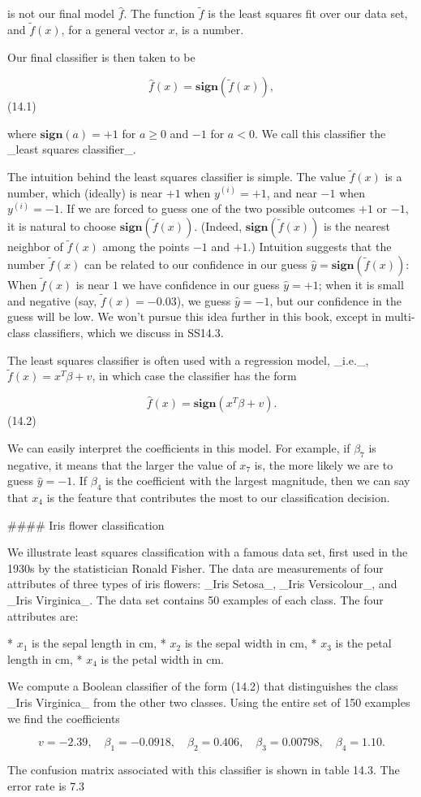 is not our final model \(\hat{f}\). The function \(\tilde{f}\) is the least squares fit over our data set, and \(\tilde{f}(x)\), for a general vector \(x\), is a number.

Our final classifier is then taken to be

\[\hat{f}(x)=\mathbf{sign}(\tilde{f}(x)),\] (14.1)

where \(\mathbf{sign}(a)=+1\) for \(a\geq 0\) and \(-1\) for \(a<0\). We call this classifier the _least squares classifier_.

The intuition behind the least squares classifier is simple. The value \(\tilde{f}(x)\) is a number, which (ideally) is near \(+1\) when \(y^{(i)}=+1\), and near \(-1\) when \(y^{(i)}=-1\). If we are forced to guess one of the two possible outcomes \(+1\) or \(-1\), it is natural to choose \(\mathbf{sign}(\tilde{f}(x))\). (Indeed, \(\mathbf{sign}(\tilde{f}(x))\) is the nearest neighbor of \(\tilde{f}(x)\) among the points \(-1\) and \(+1\).) Intuition suggests that the number \(\tilde{f}(x)\) can be related to our confidence in our guess \(\hat{y}=\mathbf{sign}(\tilde{f}(x))\): When \(\tilde{f}(x)\) is near \(1\) we have confidence in our guess \(\hat{y}=+1\); when it is small and negative (say, \(\tilde{f}(x)=-0.03\)), we guess \(\hat{y}=-1\), but our confidence in the guess will be low. We won't pursue this idea further in this book, except in multi-class classifiers, which we discuss in SS14.3.

The least squares classifier is often used with a regression model, _i.e._, \(\tilde{f}(x)=x^{T}\beta+v\), in which case the classifier has the form

\[\hat{f}(x)=\mathbf{sign}(x^{T}\beta+v).\] (14.2)

We can easily interpret the coefficients in this model. For example, if \(\beta_{7}\) is negative, it means that the larger the value of \(x_{7}\) is, the more likely we are to guess \(\hat{y}=-1\). If \(\beta_{4}\) is the coefficient with the largest magnitude, then we can say that \(x_{4}\) is the feature that contributes the most to our classification decision.

#### Iris flower classification

We illustrate least squares classification with a famous data set, first used in the 1930s by the statistician Ronald Fisher. The data are measurements of four attributes of three types of iris flowers: _Iris Setosa_, _Iris Versicolour_, and _Iris Virginica_. The data set contains 50 examples of each class. The four attributes are:

* \(x_{1}\) is the sepal length in cm,
* \(x_{2}\) is the sepal width in cm,
* \(x_{3}\) is the petal length in cm,
* \(x_{4}\) is the petal width in cm.

We compute a Boolean classifier of the form (14.2) that distinguishes the class _Iris Virginica_ from the other two classes. Using the entire set of 150 examples we find the coefficients

\[v=-2.39,\quad\beta_{1}=-0.0918,\quad\beta_{2}=0.406,\quad\beta_{3}=0.00798, \quad\beta_{4}=1.10.\]

The confusion matrix associated with this classifier is shown in table 14.3. The error rate is 7.3%

 